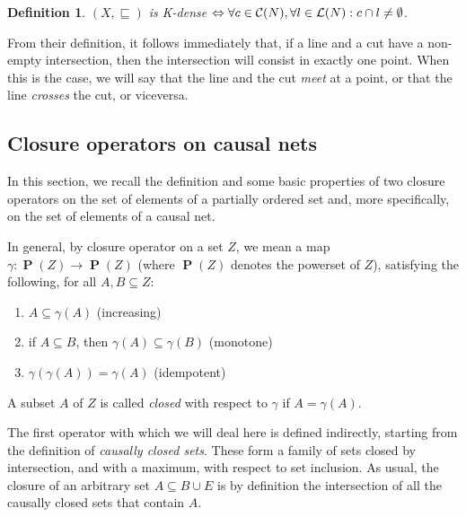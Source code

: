\documentclass{eptcs}
\newcommand{\pws}{\mathop{\mathbf{P}}\nolimits}          \newcommand{\preco}[1]{\mbox{${}^\bullet{#1}$}} \newcommand{\postc}[1]{\mbox{${#1}^\bullet$}}   \newcommand{\li}{\mathrel{\mathbf{li}}}
\newtheorem{definition}{Definition}
\begin{document}
\begin{definition}\label{d:K-density}
$(X,\sqsubseteq)$ is \emph{K-dense} $\Leftrightarrow 
\forall c \in \mathcal{C}(N), \forall l \in \mathcal{L}(N): c \cap l
\not= \emptyset$.
\end{definition}
From their definition, it follows immediately that, if a line
and a cut have a non-empty intersection, then the intersection
will consist in exactly one point. When this is the case, we
will say that the line and the cut \emph{meet} at a point, or
that the line \emph{crosses} the cut, or viceversa.
\subsection{Closure operators on causal nets}\label{s:causal_closure}
In this section, we recall the definition and some basic
properties of two closure operators on the set of elements
of a partially ordered set and, more specifically, on the
set of elements of a causal net.

In general, by closure operator on a set $Z$, we mean a map
$\gamma: \pws(Z) \rightarrow \pws(Z)$ (where $\pws(Z)$ denotes
the powerset of $Z$), satisfying the following,
for all $A, B \subseteq Z$:
\begin{enumerate}
  \item $A \subseteq \gamma(A)$ (increasing)
  \item if $A \subseteq B$, then $\gamma(A) \subseteq \gamma(B)$ (monotone)
  \item $\gamma(\gamma(A)) = \gamma(A)$ (idempotent)
\end{enumerate}
A subset $A$ of $Z$ is called \emph{closed} with respect to $\gamma$
if $A = \gamma(A)$.


The first operator with which we will deal here is defined
indirectly, starting from the
definition of \emph{causally closed sets}. These form a family of sets
closed by intersection, and with a maximum, with respect to set
inclusion. As usual, the closure of an arbitrary set
$A \subseteq B \cup E$ is by definition
the intersection of all the causally closed sets that contain $A$.
\end{document}
